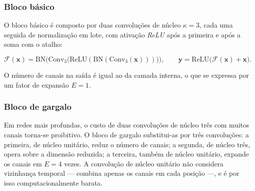 \begin{figure}[h!]
{
	}{
	}
\end{figure}

\subsubsection{Bloco básico}
\label{subsubsec:fund-bloco-basico}

O bloco básico é composto por duas convoluções de núcleo $\kappa = 3$, cada
uma seguida de normalização em lote, com ativação \textit{ReLU} após a
primeira e após a soma com o atalho:

\begin{equation}
	\mathcal{F}(\mathbf{x}) = \mathrm{BN}\Big(\mathrm{Conv}_3\big(
	\mathrm{ReLU}(\mathrm{BN}(\mathrm{Conv}_3(\mathbf{x})))\big)\Big),
	\qquad
	\mathbf{y} = \mathrm{ReLU}\big(\mathcal{F}(\mathbf{x}) + \mathbf{x}\big).
	\label{eq:bloco-basico}
\end{equation}

O número de canais na saída é igual ao da camada interna, o que se expressa
por um fator de expansão $E = 1$.

\subsubsection{Bloco de gargalo}
\label{subsubsec:fund-bloco-gargalo}

Em redes mais profundas, o custo de duas convoluções de núcleo três com
muitos canais torna-se proibitivo. O bloco de gargalo substitui-as por três
convoluções: a primeira, de núcleo unitário, reduz o número de canais; a
segunda, de núcleo três, opera sobre a dimensão reduzida; a terceira, também
de núcleo unitário, expande os canais em $E = 4$ vezes. A convolução de
núcleo unitário não considera vizinhança temporal --- combina apenas os
canais em cada posição ---, e é por isso computacionalmente barata.


